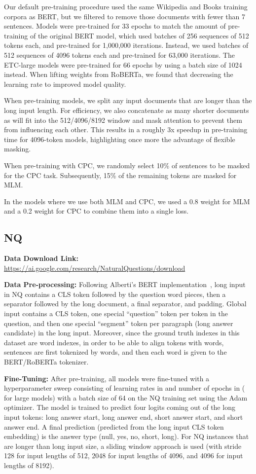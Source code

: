 \documentclass[11pt,a4paper]{article}
\begin{document}
Our default pre-training procedure used the same Wikipedia and Books training corpora as BERT, but we filtered to remove those documents with fewer than 7 sentences. Models were pre-trained for 33 epochs to match the amount of pre-training of the original BERT model, which used batches of 256 sequences of 512 tokens each, and pre-trained for 1,000,000 iterations. Instead, we used batches of 512 sequences of 4096 tokens each and pre-trained for 63,000 iterations.  The ETC-large models were pre-trained for 66 epochs by using a batch size of 1024 instead. When lifting weights from RoBERTa, we found that decreasing the learning rate to  improved model quality.


When pre-training models, we split any input documents that are longer than the long input length. For efficiency, we also concatenate as many shorter documents as will fit into the 512/4096/8192 window and mask attention to prevent them from influencing each other. This results in a roughly 3x speedup in pre-training time for 4096-token models, highlighting once more the advantage of flexible masking.

When pre-training with CPC, we randomly select 10\% of sentences to be masked for the CPC task. Subsequently, 15\% of the remaining tokens are masked for MLM.

In the models where we use both MLM and CPC, we used a 0.8 weight for MLM and a 0.2 weight for CPC to combine them into a single loss.

\subsection*{NQ}

{\bf Data Download Link:} \url{https://ai.google.com/research/NaturalQuestions/download}

{\bf Data Pre-processing:} Following Alberti's BERT implementation~\cite{alberti2019bert}, long input in NQ contains a CLS token followed by the question word pieces, then a separator followed by the long document, a final separator, and padding. Global input contains a CLS token, one special ``question'' token per token in the question, and then one special ``segment'' token per paragraph (long answer candidate) in the long input. Moreover, since the ground truth indexes in this dataset are word indexes, in order to be able to align tokens with words, sentences are first tokenized by words, and then each word is given to the BERT/RoBERTa tokenizer. 

{\bf Fine-Tuning:} After pre-training, all models were fine-tuned with a hyperparameter sweep consisting of learning rates in  and number of epochs in  ( for large models) with a batch size of 64 on the NQ training set using the Adam optimizer. The model is trained to predict four logits coming out of the long input tokens: long answer start, long answer end, short answer start, and short answer end. A final prediction (predicted from the long input CLS token embedding) is the answer type (null, yes, no, short, long). For NQ instances that are longer than long input size, a sliding window approach is used (with stride 128 for input lengths of 512, 2048 for input lengths of 4096, and 4096 for input lengths of 8192).
\end{document}
